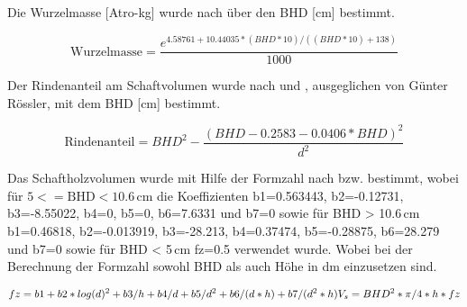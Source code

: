 \documentclass[twocolumn]{scrartcl}
\begin{document}
Die Wurzelmasse [Atro-kg] wurde nach
\cite{petersson2006belowGroundBiomass} über den BHD [cm] bestimmt.

\begin{dmath}
  \label{eq:wurzelmasse}
  \text{Wurzelmasse} = \frac{e^{4.58761 + 10.44035 * (BHD*10) / ((BHD*10) + 138)}}{1000}
\end{dmath}

Der Rindenanteil am Schaftvolumen wurde nach
\cite{peintinger1973kubierungstabelle} und
\cite{guede1988kubierungstabelle}, ausgeglichen von Günter Rössler, mit
dem BHD [cm] bestimmt.

\begin{dmath}
  \label{eq:rindenanteil}
  \text{Rindenanteil} = BHD^2 - \frac{(BHD - 0.2583 - 0.0406*BHD)^2}{d^2}
\end{dmath}

Das Schaftholzvolumen wurde mit Hilfe der Formzahl nach
\cite{pollanschuetz1974Formzahlen}
bzw. \cite{schieler1997DisWaldinventur} bestimmt, wobei für
$5 <= \text{BHD} < 10.6$\,cm die Koeffizienten b1=0.563443,
b2=-0.12731, b3=-8.55022, b4=0, b5=0, b6=7.6331 und b7=0 sowie für BHD
> 10.6\,cm b1=0.46818, b2=-0.013919, b3=-28.213, b4=0.37474,
b5=-0.28875, b6=28.279 und b7=0 sowie für BHD < 5\,cm fz=0.5 verwendet
wurde. Wobei bei der Berechnung der Formzahl sowohl BHD als auch Höhe
in dm einzusetzen sind.

\begin{dmath}
  \label{eq:Schaftholz}
  fz = b1 + b2*log(d)^2 + b3/h + b4/d + b5/d^2 + b6/(d*h) + b7/(d^2*h)\\
  V_s = BHD^2* \pi / 4 * h * fz
\end{dmath}
\end{document}
